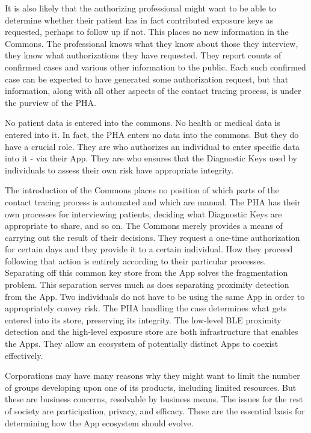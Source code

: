 It is also likely that the authorizing professional might want to be able to determine whether their patient has in fact contributed exposure keys as requested, perhaps to follow up if not.
This places no new information in the Commons.
The professional knows what they know about those they interview, they know what authorizations they have requested.
They report counts of confirmed cases and various other information to the public.
Each such confirmed case can be expected to have generated some authorization request, but that information, along with all other aspects of the contact tracing process, is under the purview of the PHA.

No patient data is entered into the commons.
No health or medical data is entered into it.
In fact, the PHA enters no data into the commons.
But they do have a crucial role.
They are who authorizes an individual to enter specific data into it - via their App.
They are who ensures that the Diagnostic Keys used by individuals to assess their own risk have appropriate integrity.

The introduction of the Commons places no position of which parts of the contact tracing process is automated and which are manual.
The PHA has their own processes for interviewing patients, deciding what Diagnostic Keys are appropriate to share, and so on.
The Commons merely provides a means of carrying out the result of their decisions.
They request a one-time authorization for certain days and they provide it to a certain individual.
How they proceed following that action is entirely according to their particular processes.
Separating off this common key store from the App solves the fragmentation problem.
This separation serves much as does separating proximity detection from the App.
Two individuals do not have to be using the same App in order to appropriately convey risk.
The PHA handling the case determines what gets entered into its store, preserving its integrity.
The low-level BLE proximity detection and the high-level exposure store are both infrastructure that enables the Apps.
They allow an ecosystem of potentially distinct Apps to coexist effectively.

Corporations may have many reasons why they might want to limit the number of groups developing upon one of its products, including limited resources.  But these are business concerns, resolvable by business means.  The issues for the rest of society are participation, privacy, and efficacy.  These are the essential basis for determining how the App ecosystem should evolve.

